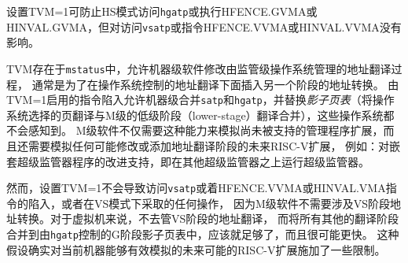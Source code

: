 设置TVM=1可防止HS模式访问{\tt hgatp}或执行HFENCE.GVMA或HINVAL.GVMA，但对访问{\tt vsatp}或指令HFENCE.VVMA或HINVAL.VVMA没有影响。

\begin{commentary}
  TVM存在于{\tt mstatus}中，允许机器级软件修改由监管级操作系统管理的地址翻译过程，
  通常是为了在操作系统控制的地址翻译下面插入另一个阶段的地址转换。
  由TVM=1启用的指令陷入允许机器级合并{\tt satp}和{\tt hgatp}，并替换\emph{影子页表}（将操作系统选择的页翻译与M级的低级阶段（lower-stage）翻译合并），这些操作系统都不会感知到。
  M级软件不仅需要这种能力来模拟尚未被支持的管理程序扩展，而且还需要模拟任何可能修改或添加地址翻译阶段的未来\mbox{RISC-V}扩展，
  例如：对嵌套超级监管器程序的改进支持，即在其他超级监管器之上运行超级监管器。

然而，设置TVM=1不会导致访问{\tt vsatp}或着HFENCE.VVMA或HINVAL.VMA指令的陷入，或者在VS模式下采取的任何操作，
因为M级软件不需要涉及VS阶段地址转换。对于虚拟机来说，不去管VS阶段的地址翻译，
而将所有其他的翻译阶段合并到由{\tt hgatp}控制的G阶段影子页表中，应该就足够了，而且很可能更快。
这种假设确实对当前机器能够有效模拟的未来可能的\mbox{RISC-V}扩展施加了一些限制。
\end{commentary}

